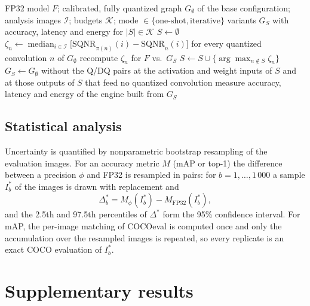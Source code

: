 \documentclass[pdflatex,sn-mathphys-num]{sn-jnl}%
\theoremstyle{thmstyleone}%
\theoremstyle{thmstyletwo}%
\theoremstyle{thmstylethree}%
\begin{document}
\begin{appendices}
\begin{algorithm}[t]
\caption{PEP-AI-guided selective precision}\label{alg:selective}
\begin{algorithmic}[1]
\Require FP32 model $F$; calibrated, fully quantized graph $G_\emptyset$ of the base configuration; analysis images $\mathcal{I}$; budgets $\mathcal{K}$; mode $\in\{\text{one-shot},\text{iterative}\}$
\Ensure variants $G_S$ with accuracy, latency and energy for $|S|\in\mathcal{K}$
\State $S\gets\emptyset$
\State $\zeta_n\gets\operatorname{median}_{i\in\mathcal{I}}\bigl[\mathrm{SQNR}_{\pi(n)}(i)-\mathrm{SQNR}_n(i)\bigr]$ for every quantized convolution $n$ of $G_\emptyset$ 
    \State recompute $\zeta_n$ for $F$ vs.\ $G_S$ 
  \EndIf
  \State $S\gets S\cup\{\arg\max_{n\notin S}\zeta_n\}$
  \State $G_S\gets G_\emptyset$ without the Q/DQ pairs at the activation and weight inputs of $S$ and at those outputs of $S$ that feed no quantized convolution 
   measure accuracy, latency and energy of the engine built from $G_S$ \EndIf
\EndFor
\end{algorithmic}
\end{algorithm}

\subsection{Statistical analysis}\label{sec:supp-stats}
Uncertainty is quantified by nonparametric bootstrap resampling of the evaluation images. For an accuracy metric $M$ (mAP or top-1) the difference between a precision $\phi$ and FP32 is resampled in pairs: for $b=1,\dots,1\,000$ a sample $I_b^\ast$ of the images is drawn with replacement and
\begin{equation}
\Delta_b^\ast=M_\phi(I_b^\ast)-M_\mathrm{FP32}(I_b^\ast),\label{eq:bootstrap}
\end{equation}
and the 2.5th and 97.5th percentiles of $\Delta^\ast$ form the 95\% confidence interval. For mAP, the per-image matching of COCOeval is computed once and only the accumulation over the resampled images is repeated, so every replicate is an exact COCO evaluation of $I_b^\ast$.

\section{Supplementary results}\label{sec:supp-results}


\end{appendices}
\end{document}
